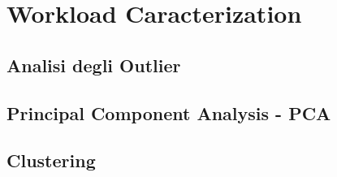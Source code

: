 \chapter{Workload Caracterization}

\section{Analisi degli Outlier}
\section{Principal Component Analysis - PCA}
\section{Clustering}